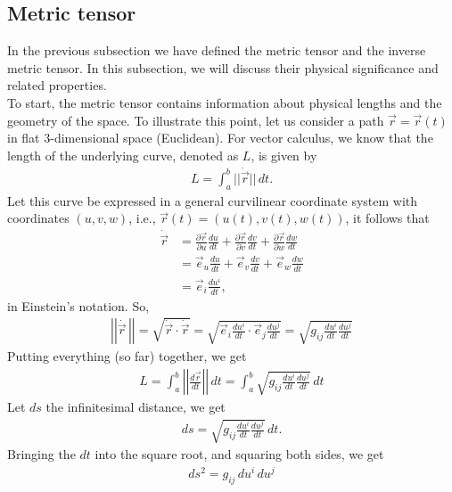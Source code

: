 \documentclass{article}
\theoremstyle{definition}
\begin{document}
\subsection{Metric tensor}
In the previous subsection we have defined the metric tensor and the inverse metric tensor. In this subsection, we will discuss their physical significance and related properties.\\

To start, the metric tensor contains information about physical lengths and the geometry of the space. To illustrate this point, let us consider a path $\vec{r} = \vec{r}(t)$ in flat 3-dimensional space (Euclidean). For vector calculus, we know that the length of the underlying curve, denoted as $L$, is given by
\begin{align*}
L = \int_{a}^{b}\vert\vert \dot{\vec{r}}\vert\vert\,dt.
\end{align*}
Let this curve be expressed in a general curvilinear coordinate system with coordinates $(u,v,w)$, i.e., $\vec{r}(t) = (u(t),v(t),w(t))$, it follows that
\begin{align*}
\dot{\vec{r}} &= \frac{\partial \vec{r}}{\partial u}\frac{d u}{d t} + \frac{\partial \vec{r}}{\partial v}\frac{d v}{d t} + \frac{\partial \vec{r}}{\partial w}\frac{d w}{d t}\\
&= \vec{e}_u\frac{d u}{d t} + \vec{e}_v\frac{d v}{d t} + \vec{e}_w\frac{d w}{d t}\\
&= \vec{e}_i\frac{d u^i}{d t},
\end{align*} 
in Einstein's notation. So, 
\begin{align*}
\left| \left|  \dot{\vec{r}\,}\right| \right|  = \sqrt{\dot{\vec{r}}\cdot\dot{\vec{r}}} = \sqrt{\vec{e}_i\frac{d u^i}{d t}\cdot \vec{e}_j\frac{d u^j}{d t}} = \sqrt{g_{ij}\frac{du^i}{dt}\frac{du^j}{dt}}
\end{align*} 
Putting everything (so far) together, we get
\begin{align*}
\boxed{L = \int_{a}^{b}\left| \left|  \frac{d\vec{r}}{dt} \right| \right| \,dt = \int_{a}^{b}\sqrt{g_{ij}\frac{du^i}{dt}\frac{du^j}{dt}}\,dt}
\end{align*}
Let $ds$ the infinitesimal distance, we get
\begin{align*}
ds = \sqrt{g_{ij}\frac{du^i}{dt}\frac{du^j}{dt}}\,dt.
\end{align*}
Bringing the $dt$ into the square root, and squaring both sides, we get
\begin{align*}
\boxed{ds^2 = g_{ij}\,du^i\,du^j}
\end{align*}
\end{document}

